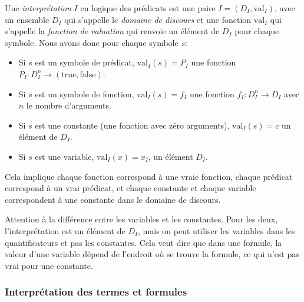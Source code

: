 Une {\em interprétation} $I$ en logique des prédicats est une paire $I = (D_I, \mathrm{val}_I)$,
avec un ensemble $D_I$ qui s'appelle le {\em domaine de discours} et une fonction $\mathrm{val}_I$ qui s'appelle
la {\em fonction de valuation} qui renvoie un élément de $D_I$ pour chaque symbole.
Nous avons donc pour chaque symbole $s$:
\begin{itemize}
\item Si $s$ est un symbole de prédicat,
 $\mathrm{val}_{I}(s) = P_{I}$ une fonction $P_{I}:D_{I}^{n} \rightarrow (\mathrm{true},\mathrm{false})$.
\item Si $s$ est un symbole de fonction,
 $\mathrm{val}_I(s) = f_I$ une fonction $f_{I}:D_{I}^{n} \rightarrow D_{I}$ avec $n$ le nombre d'arguments.
\item Si $s$ est une constante (une fonction avec zéro arguments),
 $\mathrm{val}_I(s) = c$ un élément de $D_I$.
\item Si $s$ est une variable,
 $\mathrm{val}_{I}(x) = x_{I}$, un élément $D_{I}$.
\end{itemize}
Cela implique chaque fonction correspond à une vraie fonction, chaque prédicat
correspond à un vrai prédicat, et chaque constante et chaque variable correspondent à une constante dans le domaine de discours.

Attention à la différence entre les variables et les constantes.
Pour les deux, l'interprétation est un élément de $D_I$,
mais on peut utiliser les variables dans les quantificateurs et pas les constantes.
Cela veut dire que dans une formule, la valeur d'une variable dépend de l'endroit où se trouve la formule,
ce qui n'est pas vrai pour une constante.

\subsubsection{Interprétation des termes et formules}

